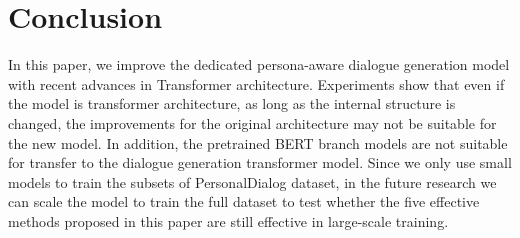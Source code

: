 \documentclass[letterpaper]{article} %
\begin{document}
\begin{table*} [b]
\centering
\caption{Ablation study results, bold data is degradation metric}
\label{tab:result-ablation}
\end{table*}
                     

\section[Conclusion]{Conclusion} 
In this paper, we improve the dedicated persona-aware dialogue generation model with recent advances in Transformer architecture. Experiments show that even if the model is transformer architecture, as long as the internal structure is changed, the improvements for the original architecture may not be suitable for the new model. In addition, the pretrained BERT branch models are not suitable for transfer to the dialogue generation transformer model. Since we only use small models to train the subsets of PersonalDialog dataset, in the future research we can scale the model to train the full dataset to test whether the five effective methods proposed in this paper are still effective in large-scale training. 




\end{document}
